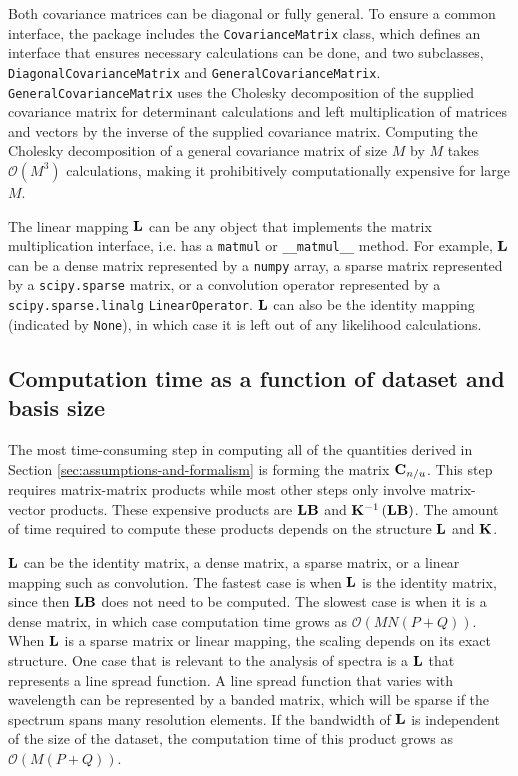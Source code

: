 \documentclass[manuscript]{aastex62}
\newcommand{\vx}[1]{{\bf {#1}}}
\begin{document}
Both covariance matrices can be diagonal or fully general.
To ensure a common interface, the package includes the \texttt{CovarianceMatrix} class, which defines an interface that ensures necessary calculations can be done, and two subclasses, \texttt{DiagonalCovarianceMatrix} and \texttt{GeneralCovarianceMatrix}.
\texttt{GeneralCovarianceMatrix} uses the Cholesky decomposition of the supplied covariance matrix for determinant calculations and left multiplication of matrices and vectors by the inverse of the supplied covariance matrix.
Computing the Cholesky decomposition of a general covariance matrix of size $M$ by $M$ takes $\mathcal{O}(M^3)$ calculations, making it prohibitively computationally expensive for large $M$.

The linear mapping $\vx{L}$ can be any object that implements the matrix multiplication interface, i.e. has a \texttt{matmul} or \texttt{\_\_matmul\_\_} method.
For example, $\vx{L}$ can be a dense matrix represented by a \texttt{numpy} array, a sparse matrix represented by a \texttt{scipy.sparse} matrix, or a convolution operator represented by a \texttt{scipy.sparse.linalg} \texttt{LinearOperator}.
$\vx{L}$ can also be the identity mapping (indicated by \texttt{None}), in which case it is left out of any likelihood calculations.


\subsection{Computation time as a function of dataset and basis size}
\label{sec:scaling}
The most time-consuming step in computing all of the quantities derived in Section \ref{sec:assumptions-and-formalism} is forming the matrix $\vx{C}_{n/u}$.
This step requires matrix-matrix products while most other steps only involve matrix-vector products.
These expensive products are $\vx{L}\vx{B}$ and $\vx{K}^{-1} \left(\vx{L} \vx{B}\right)$.
The amount of time required to compute these products depends on the structure $\vx{L}$ and $\vx{K}$.

$\vx{L}$ can be the identity matrix, a dense matrix, a sparse matrix, or a linear mapping such as convolution.
The fastest case is when $\vx{L}$ is the identity matrix, since then $\vx{L}\vx{B}$ does not need to be computed.
The slowest case is when it is a dense matrix, in which case computation time grows as $\mathcal{O}(MN(P+Q))$.
When $\vx{L}$ is a sparse matrix or linear mapping, the scaling depends on its exact structure.
One case that is relevant to the analysis of spectra is a $\vx{L}$ that represents a line spread function.
A line spread function that varies with wavelength can be represented by a banded matrix, which will be sparse if the spectrum spans many resolution elements.
If the bandwidth of $\vx{L}$ is independent of the size of the dataset, the computation time of this product grows as $\mathcal{O}(M(P+Q))$.
\end{document}
